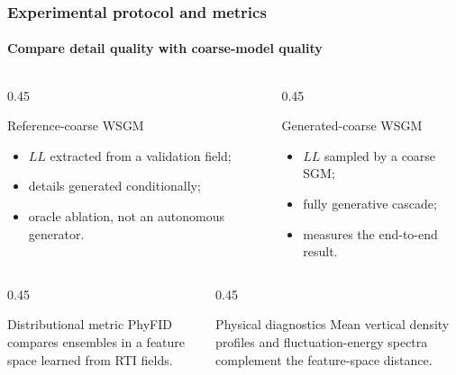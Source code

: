 \documentclass[t,10pt,aspectratio=169]{beamer}
\begin{document}
\begin{frame}
  \frametitle{Experimental protocol and metrics}
  \framesubtitle{Compare detail quality with coarse-model quality}
  \begin{columns}[T,onlytextwidth]
    \begin{column}{0.45\textwidth}
      \begin{block}{Reference-coarse WSGM}
        \small
        \begin{itemize}
          \item $LL$ extracted from a validation field;
          \item details generated conditionally;
          \item oracle ablation, not an autonomous generator.
        \end{itemize}
      \end{block}
    \end{column}
    \begin{column}{0.45\textwidth}
      \begin{alertblock}{Generated-coarse WSGM}
        \small
        \begin{itemize}
          \item $LL$ sampled by a coarse SGM;
          \item fully generative cascade;
          \item measures the end-to-end result.
        \end{itemize}
      \end{alertblock}
    \end{column}
  \end{columns}
  \vspace{1.2ex}
  \begin{columns}[T,onlytextwidth]
    \begin{column}{0.45\textwidth}
      \begin{block}{Distributional metric}
        \small PhyFID compares ensembles in a feature space learned from RTI fields.
      \end{block}
    \end{column}
    \begin{column}{0.45\textwidth}
      \begin{block}{Physical diagnostics}
        \small Mean vertical density profiles and fluctuation-energy spectra complement the feature-space distance.
      \end{block}
    \end{column}
  \end{columns}
\end{frame}
\end{document}
